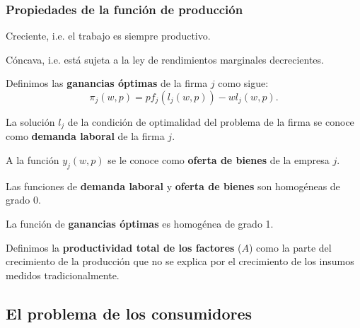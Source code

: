 \documentclass[8pt,a4paper]{extarticle}
\begin{document}
\begin{multicols}{3}
	\subsubsection*{Propiedades de la función de producción}

	\begin{eqlist}
		\item Creciente, i.e. el trabajo es siempre productivo.
		\item Cóncava, i.e. está sujeta a la ley de rendimientos marginales decrecientes.
	\end{eqlist}

	\begin{boxdef}
		Definimos las \textbf{ganancias óptimas} de la firma $j$ como sigue:
		\[
			\pi_j(w, p) = pf_j(l_j(w, p)) - wl_j(w, p)
			.\]
	\end{boxdef}

	\begin{boxdef}
		La solución $l_j$ de la condición de optimalidad del problema de la firma se conoce como \textbf{demanda laboral} de la firma $j$.
	\end{boxdef}

	\begin{boxdef}
		A la función $y_j(w, p)$ se le conoce como \textbf{oferta de bienes} de la empresa $j$.
	\end{boxdef}

	\begin{boxprop}
		Las funciones de \textbf{demanda laboral} y \textbf{oferta de bienes}  son homogéneas de grado 0.
	\end{boxprop}

	\begin{boxprop}
		La función de \textbf{ganancias óptimas} es homogénea de grado 1.
	\end{boxprop}

	\begin{boxdef}
		Definimos la \textbf{productividad total de los factores} ($A$) como la parte del crecimiento de la producción que no se explica por el crecimiento de los insumos medidos tradicionalmente.
	\end{boxdef}

	\subsection{El problema de los consumidores}


\end{multicols}
\end{document}
